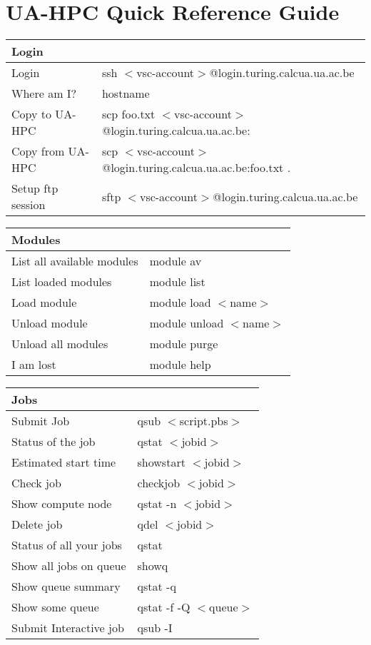 \chapter{UA-HPC Quick Reference Guide}

\begin{tabular}{|p{1.0in}|p{2.9in}|} \hline
\multicolumn{2}{|p{1in}|}{\textbf{Login}} \\ \hline
Login & ssh $<$vsc-account$>$@login.turing.calcua.ua.ac.be \\ \hline
Where am I? & hostname \\ \hline
Copy to UA-HPC & scp  foo.txt $<$vsc-account$>$@login.turing.calcua.ua.ac.be: \\ \hline
Copy from UA-HPC & scp $<$vsc-account$>$@login.turing.calcua.ua.ac.be:foo.txt     . \\ \hline
Setup ftp session & sftp $<$vsc-account$>$@login.turing.calcua.ua.ac.be \\ \hline
\end{tabular}

\begin{tabular}{|p{1.3in}|p{2.6in}|} \hline
\multicolumn{2}{|p{1in}|}{\textbf{Modules}} \\ \hline
List all available modules & module av \\ \hline
List loaded modules & module list \\ \hline
Load module & module load $<$name$>$ \\ \hline
Unload module & module unload $<$name$>$ \\ \hline
Unload all modules & module purge \\ \hline
I am lost & module help \\ \hline
\end{tabular}

\begin{tabular}{|p{1.3in}|p{2.6in}|} \hline
\multicolumn{2}{|p{1in}|}{\textbf{Jobs}} \\ \hline
Submit Job & qsub  $<$script.pbs$>$ \\ \hline
Status of the job & qstat $<$jobid$>$ \\ \hline
Estimated start time & showstart $<$jobid$>$ \\ \hline
Check job & checkjob $<$jobid$>$ \\ \hline
Show compute node & qstat -n $<$jobid$>$ \\ \hline
Delete job & qdel $<$jobid$>$ \\ \hline
Status of all your jobs & qstat \\ \hline
Show all jobs on  queue & showq \\ \hline
Show queue summary & qstat -q \\ \hline
Show some queue & qstat -f -Q $<$queue$>$ \\ \hline
Submit Interactive job & qsub -I \\ \hline
\end{tabular}

